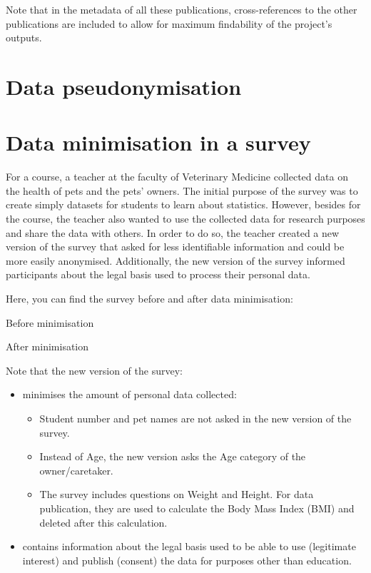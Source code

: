 \documentclass[
]{book}
\providecommand{\tightlist}{%
  \setlength{\itemsep}{0pt}\setlength{\parskip}{0pt}}
\begin{document}
Note that in the metadata of all these publications, cross-references to the
other publications are included to allow for maximum findability of the
project's outputs.

\hypertarget{youth-pseudonymisation}{%
\chapter{Data pseudonymisation}\label{youth-pseudonymisation}}

\hypertarget{pet-survey}{%
\chapter{Data minimisation in a survey}\label{pet-survey}}

For a course, a teacher at the faculty of Veterinary Medicine collected data on
the health of pets and the pets' owners. The initial purpose of the survey was
to create simply datasets for students to learn about statistics. However,
besides for the course, the teacher also wanted to use the collected data for
research purposes and share the data with others. In order to do so, the teacher
created a new version of the survey that asked for less identifiable information
and could be more easily anonymised. Additionally, the new version of the survey
informed participants about the legal basis used to process their personal data.

Here, you can find the survey before and after data minimisation:

Before minimisation

After minimisation

Note that the new version of the survey:

\begin{itemize}
\tightlist
\item
  minimises the amount of personal data collected:

  \begin{itemize}
  \tightlist
  \item
    Student number and pet names are not asked in the new version of the survey.
  \item
    Instead of Age, the new version asks the Age category of the owner/caretaker.
  \item
    The survey includes questions on Weight and Height. For data publication,
    they are used to calculate the Body Mass Index (BMI) and deleted after this
    calculation.
  \end{itemize}
\item
  contains information about the legal basis used to be able to use (legitimate
  interest) and publish (consent) the data for purposes other than education.
\end{itemize}
\end{document}
